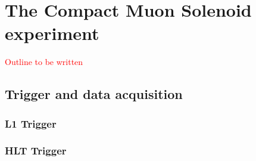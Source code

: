 \chapter{The Compact Muon Solenoid experiment \label{chap:CMS}}

\textcolor{red}{Outline to be written}



\section{Trigger and data acquisition}

\subsection{L1 Trigger}

\subsection{HLT Trigger \label{sec:cms_hlt}}

